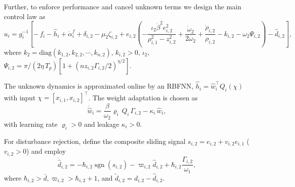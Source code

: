 \documentclass[pdflatex,sn-mathphys-num]{sn-jnl}%
\theoremstyle{thmstyleone}%
\theoremstyle{thmstyletwo}%
\theoremstyle{thmstylethree}%
\begin{document}
Further, to enforce performance and cancel unknown terms we design the main control law as
\begin{equation}\label{eq:40}
	u_i = g_i^{-1}\left[-\,f_i - \hat{h}_i + \dot{\alpha}^{f}_{i}+\delta_{i,2}-\mu_2 \zeta_{i,2}+e_{i,2}\left(-\frac{\iota_2  \dot{\beta}^{2} e_{i,2}^{2}}{\rho_{i,1}^{2} - z_{i,2}^{2}} +\frac{\dot{\omega}_{2}}{2 \omega_{2}}+\frac{\dot{\rho}_{i,2}}{\rho_{{i,2}}}- k_{i,2}- \omega_{2}\Psi_{{i,2}}   \right)-\hat d_{i,2}
	\right],
\end{equation}
where $k_{2}=\text{diag}(k_{1,2}, k_{2,2},\cdots, k_{n,2})$, $k_{i,2}>0 $, $\iota_2$, $ \Psi_{i,2}={\pi}/({2 \eta\,T_p})
	[1+(n z_{i,2}\varGamma_{i,2}/2)^{{\eta}/{2}}]$.
	
The unknown dynamics is approximated online by an RBFNN,
$\hat h_i=\hat w_i^{\top}Q_i(\chi)$ with input $\chi=[x_{i,1},x_{i,2}]^\top$.
The weight adaptation is chosen as
\begin{equation}\label{eq:42}
	\dot{\hat w}_i
	=\frac{\beta }{\omega_{2}} \varrho_i\, Q_i\, \varGamma_{{i,2}} - \kappa_i \,\hat w_i,
\end{equation}
with learning rate $\varrho_i>0$ and leakage $\kappa_i>0$.

For disturbance rejection, define the composite sliding signal
$s_{i,2}=e_{i,2}+v_{i,2}e_{i,1}$ ($v_{i,2}>0$) and employ
\begin{equation}\label{eq:41}
	\dot{\hat d}_{i,2} = -\hbar_{i,2} \operatorname{sgn}(s_{i,2})-\varpi_{i,2} {\hat d}_{i,2}+\hbar_{i,2} \frac{ \varGamma_{{i,2}}}{{\omega}_{1}},
\end{equation}
where $\hbar_{i,2} >\bar{d}, \varpi_{i,2}>\hbar_{i,2}+1$, and $\tilde{d}_{i,2} = d_{i,2} - \hat{d}_{i,2}$.
\end{document}
